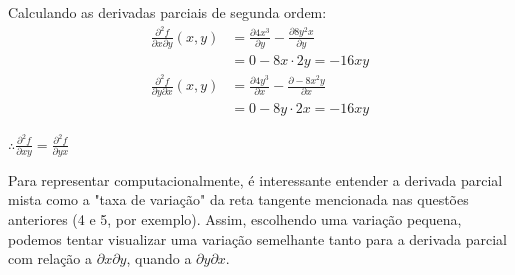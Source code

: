 \documentclass[../main.tex]{subfiles}
\begin{document}
\begin{solucao}
\begin{enumerate}[label=\arabic*.]
				Calculando as derivadas parciais de segunda ordem:
				\begin{align*}
					\frac{\partial^2 f}{\partial x \partial y}(x,y)
					&=\frac{\partial 4x^3}{\partial y}-\frac{\partial 8y^2x}{\partial y}\\
					&=0-8x\cdot 2y=-16xy
				\end{align*}
				\begin{align*}
					\frac{\partial^2 f}{\partial y \partial x}(x,y)
					&=\frac{\partial 4y^3}{\partial x}-\frac{\partial -8x^2y}{\partial x}\\
					&=0-8y\cdot 2x=-16xy
				\end{align*}
				
				$\therefore \frac{\partial^2 f}{\partial xy}=\frac{\partial^2 f}{\partial yx}$ 
				
				Para representar computacionalmente, é interessante entender a derivada parcial mista como a "taxa de variação" da reta tangente mencionada nas questões anteriores (4 e 5, por exemplo). Assim, escolhendo uma variação pequena, podemos tentar visualizar uma variação semelhante tanto para a derivada parcial com relação a $\partial x \partial y$, quando a $\partial y \partial x$.
				

\end{enumerate}
\end{solucao}
\end{document}
